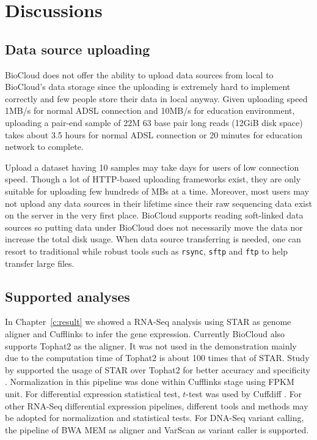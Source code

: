 \chapter{Discussions}
\label{c:discussion}


\section{Data source uploading}

BioCloud does not offer the ability to upload data sources from local to
BioCloud's data storage since the uploading is extremely hard to implement
correctly and few people store their data in local anyway. Given uploading
speed 1MB/s for normal ADSL connection and 10MB/s for education environment,
uploading a pair-end sample of 22M 63 base pair long reads (12GiB disk space)
takes about 3.5 hours for normal ADSL connection or 20 minutes for education
network to complete.

Upload a dataset having 10 samples may take days for users of low connection
speed. Though a lot of HTTP-based uploading frameworks exist, they are only
suitable for uploading few hundreds of MBs at a time. Moreover, most users may
not upload any data sources in their lifetime since their raw sequencing data
exist on the server in the very first place. BioCloud supports reading
soft-linked data sources so putting data under BioCloud does not necessarily
move the data nor increase the total disk usage. When data source transferring
is needed, one can resort to traditional while robust tools  such as
\texttt{rsync}, \texttt{sftp} and \texttt{ftp} to help transfer large files.


\section{Supported analyses}


In Chapter~\ref{c:result} we showed a RNA-Seq analysis using STAR as genome
aligner and Cufflinks to infer the gene expression. Currently BioCloud also
supports Tophat2 as the aligner. It was not used in the demonstration mainly
due to the computation time of Tophat2 is about 100 times that of STAR. Study
by \citeauthor{engstrom2013:systematic} supported the usage of STAR over
Tophat2 for better accuracy and specificity \cite{engstrom2013:systematic}.
Normalization in this pipeline was done within Cufflinks stage using FPKM unit.
For differential expression statistical test, $t$-test was used by Cuffdiff
\cite{rapaport2013:comprehensive}. For other RNA-Seq differential expression
pipelines, different tools and methods may be adopted for normalization and
statistical tests. For DNA-Seq variant calling, the pipeline of BWA MEM as
aligner and VarScan as variant caller is supported.

